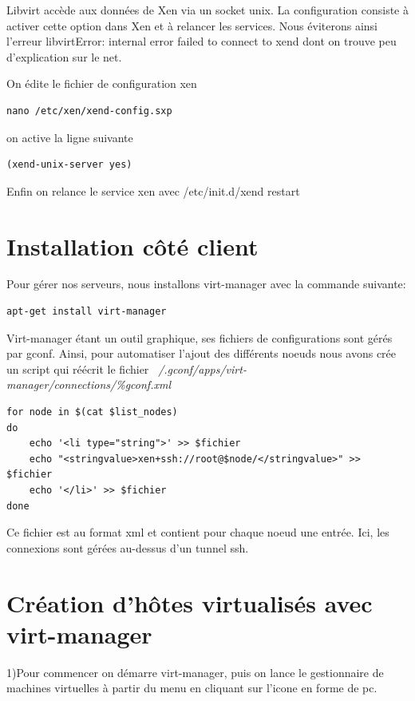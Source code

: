 Libvirt accède aux données de Xen via un socket unix. La configuration consiste à activer cette option dans Xen et à relancer les services.
Nous éviterons ainsi l’erreur libvirtError: internal error failed to connect to xend dont on trouve peu d’explication sur le net.

On édite le fichier de configuration xen
\begin{lstlisting} 
nano /etc/xen/xend-config.sxp
\end{lstlisting}
 on active la ligne suivante
\begin{lstlisting} 
(xend-unix-server yes)
\end{lstlisting}
 Enfin on relance le service xen avec /etc/init.d/xend restart

\section{Installation côté client}
Pour gérer nos serveurs, nous installons virt-manager avec la commande suivante:
\begin{lstlisting} 
apt-get install virt-manager
\end{lstlisting}
Virt-manager étant un outil graphique, ses fichiers de configurations sont gérés par gconf. Ainsi, pour automatiser l'ajout des différents noeuds nous avons crée un script qui réécrit le fichier \emph{~/.gconf/apps/virt-manager/connections/\%gconf.xml}
\begin{lstlisting}
for node in $(cat $list_nodes)
do
    echo '<li type="string">' >> $fichier
    echo "<stringvalue>xen+ssh://root@$node/</stringvalue>" >> $fichier
    echo '</li>' >> $fichier
done
\end{lstlisting}
Ce fichier est au format xml et contient pour chaque noeud une entrée. Ici, les connexions sont gérées au-dessus d'un tunnel ssh.
\section{Création d'hôtes virtualisés avec virt-manager}
1)Pour commencer on démarre virt-manager, puis on lance le gestionnaire de machines virtuelles à partir du menu en cliquant sur l'icone en forme de pc.

